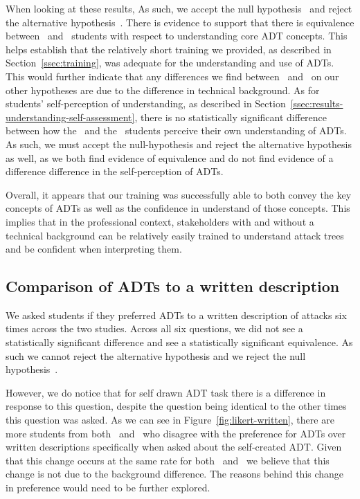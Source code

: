 When looking at these results, As such, we accept the null hypothesis~\nullhypothesis{\hypoCheckUnderstand} and reject the alternative hypothesis~\althypothesis{\hypoCheckUnderstand}. There is evidence to support that there is equivalence between \ICS\ and \SEC\ students with respect to understanding core ADT concepts. This helps establish that the relatively short training we provided, as described in Section~\ref{ssec:training}, was adequate for the understanding and use of ADTs. This would further indicate that any differences we find between \ICS\ and \SEC\ on our other hypotheses are due to the difference in technical background. As for students' self-perception of understanding, as described in Section~\ref{ssec:results-understanding-self-assessment}, there is no statistically significant difference between how the \ICS\ and the \SEC\ students perceive their own understanding of ADTs. As such, we must accept the null-hypothesis \nullhypothesis{\hypoSelfUnderstand} and reject the alternative hypothesis \althypothesis{\hypoSelfUnderstand} as well, as we both find evidence of equivalence and do not find evidence of a difference difference in the self-perception of ADTs.

Overall, it appears that our training was successfully able to both convey the key concepts of ADTs as well as the confidence in understand of those concepts. This implies that in the professional context, stakeholders with and without a technical background can be relatively easily trained to understand attack trees and be confident when interpreting them.



\subsection{Comparison of ADTs to a written description}

We asked students if they preferred ADTs to a written description of attacks six times across the two studies. Across all six questions, we did not see a statistically significant difference and see a statistically significant equivalence. As such we cannot reject the alternative hypothesis \althypothesis{\hypoWrittenComparison} and we reject the null hypothesis~\hypothesis{\hypoWrittenComparison}.

However, we do notice that for self drawn ADT task there is a difference in response to this question, despite the question being identical to the other times this question was asked. As we can see in Figure~\ref{fig:likert-written}, there are more students from both \ICS\ and \SEC\ who disagree with the preference for ADTs over written descriptions specifically when asked about the self-created ADT. Given that this change occurs at the same rate for both \ICS\ and \SEC\ we believe that this change is not due to the background difference. The reasons behind this change in preference would need to be further explored.


